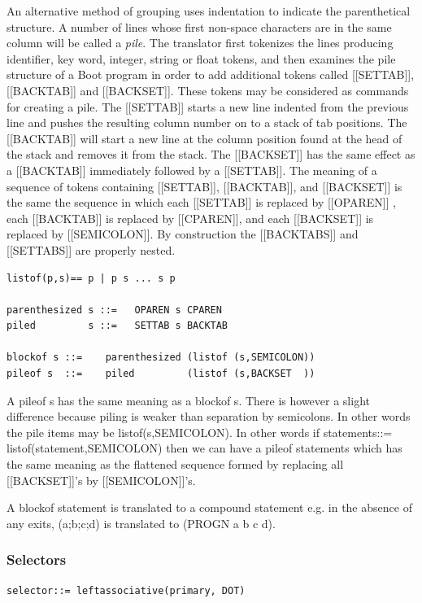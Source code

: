 \documentclass{article}
\begin{document}
An alternative method of grouping uses indentation to indicate the
parenthetical structure.
A number of lines whose first non-space characters are in the same
column will be called a \emph{pile}.  The translator first tokenizes the
lines producing identifier, key word, integer, string or float tokens,
and then examines the pile structure of a Boot program
in order to add additional tokens called [[SETTAB]], [[BACKTAB]]
and [[BACKSET]].
These tokens may be considered as commands for creating a pile.
The [[SETTAB]] starts a new line indented from the previous line and
pushes the resulting column number on to a stack of tab positions.
The [[BACKTAB]] will start a new line at the column position found
at the head of the stack and removes it from the stack.
The [[BACKSET]] has the same effect as a [[BACKTAB]] immediately followed
by a [[SETTAB]].
The meaning of a sequence of tokens containing [[SETTAB]],
[[BACKTAB]], and [[BACKSET]] is the same the sequence in which each
[[SETTAB]] is replaced by [[OPAREN]] , each [[BACKTAB]] is replaced by
[[CPAREN]], and each [[BACKSET]] is replaced by [[SEMICOLON]]. By
construction the [[BACKTABS]] and [[SETTABS]] are properly nested.
\begin{verbatim}
listof(p,s)== p | p s ... s p

parenthesized s ::=   OPAREN s CPAREN
piled         s ::=   SETTAB s BACKTAB

blockof s ::=    parenthesized (listof (s,SEMICOLON))
pileof s  ::=    piled         (listof (s,BACKSET  ))
\end{verbatim}

A pileof s has the same meaning as a blockof s.
There is however a slight difference because piling is weaker than
separation by semicolons. In other words the pile items
may be listof(s,SEMICOLON).
In other words if statements::= listof(statement,SEMICOLON) then
we can have a pileof statements which has the same meaning as
the flattened sequence formed by replacing
all [[BACKSET]]'s by [[SEMICOLON]]'s.

A blockof statement is translated to a compound statement
e.g. in the absence of any exits,
(a;b;c;d) is translated to (PROGN a b c d).

\subsubsection{Selectors}
\label{sec:boot:selector}

\begin{verbatim}
selector::= leftassociative(primary, DOT)
\end{verbatim}
\end{document}
